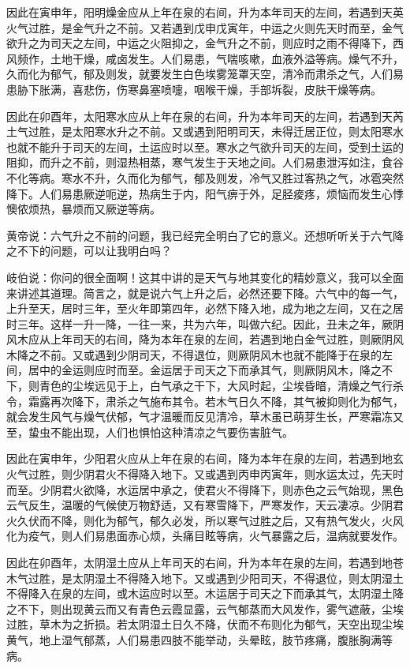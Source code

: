 \documentclass[12pt,UTF8]{ctexbook}
\begin{document}
因此在寅申年，阳明燥金应从上年在泉的右间，升为本年司天的左间，若遇到天英火气过胜，是金气升之不前。又若遇到戊申戊寅年，中运之火则先天时而至，金气欲升之为司天之左间，中运之火阻抑之，金气升之不前，则应时之雨不得降下，西风频作，土地干燥，咸卤发生。人们易患，气喘咳嗽，血液外溢等病。燥气不升，久而化为郁气，郁及则发，就要发生白色埃雾笼罩天空，清冷而肃杀之气，人们易患胁下胀满，喜悲伤，伤寒鼻塞喷嚏，咽喉干燥，手部坼裂，皮肤干燥等病。

因此在卯酉年，太阳寒水应从上年在泉的右间，升为本年司天的左间，若遇到天芮土气过胜，是太阳寒水升之不前。又或遇到阳明司天，未得迁居正位，则太阳寒水也就不能升于司天的左间，土运应时以至。寒水之气欲升司天的左间，受到土运的阻抑，而升之不前，则湿热相蒸，寒气发生于天地之间。人们易患泄泻如注，食谷不化等病。寒水不升，久而化为郁气，郁及则发，冷气又胜过客热之气，冰雹突然降下。人们易患厥逆呃逆，热病生于内，阳气痹于外，足胫痠疼，烦恼而发生心悸懊侬烦热，暴烦而又厥逆等病。

黄帝说：六气升之不前的问题，我已经完全明白了它的意义。还想听听关于六气降之不下的问题，可以让我明白吗？

岐伯说：你问的很全面啊！这其中讲的是天气与地其变化的精妙意义，我可以全面来讲述其道理。简言之，就是说六气上升之后，必然还要下降。六气中的每一气，上升至天，居时三年，至火年即第四年，必然下降入地，成为地之左间，又在之居时三年。这样一升一降，一往一来，共为六年，叫做六纪。因此，丑未之年，厥阴风木应从上年司天的右间，降为本年在泉的左间，若遇到地白金气过胜，则厥阴风木降之不前。又或遇到少阴司天，不得退位，则厥阴风木也就不能降于在泉的左间，居中的金运则应时而至。金运居于司天之下而承其气，则厥阴风木，降之不下，则青色的尘埃远见于上，白气承之干下，大风时起，尘埃昏暗，清燥之气行杀令，霜露再次降下，肃杀之气施布其令。若木气日久不降，其气被抑则化为郁气，就会发生风气与燥气伏郁，气才温暖而反见清冷，草木虽已萌芽生长，严寒霜冻又至，蛰虫不能出现，人们也惧怕这种清凉之气要伤害脏气。

因此在寅申年，少阳君火应从上年在泉的右间，降为本年在泉的左间，若遇到地玄火气过胜，则少阴君火不得降入地下。又或遇到丙申丙寅年，则水运太过，先天时而至。少阴君火欲降，水运居中承之，使君火不得降下，则赤色之云气始现，黑色云气反生，温暖的气候使万物舒适，又有寒雪降下，严寒发作，天云凄凉。少阴君火久伏而不降，则化为郁气，郁久必发，所以寒气过胜之后，又有热气发火，火风化为疫气，则人们易患面赤心烦，头痛目眩等病，火气暴露之后，温病就要发作。

因此在卯酉年，太阴湿土应从上年司天的右间，升为本年在泉的左间，若遇到地苍木气过胜，是太阴湿土不得降入地下。又或遇到少阳司天，不得退位，则太阴湿土不得降入在泉的左间，或木运应时以至。木运居于司天之下而承其气，太阴湿土降之不下，则出现黄云而又有青色云霞显露，云气郁蒸而大风发作，雾气遮蔽，尘埃过胜，草木为之折损。若太阴湿土日久不降，伏而不布则化为郁气，天空出现尘埃黄气，地上湿气郁蒸，人们易患四肢不能举动，头晕眩，肢节疼痛，腹胀胸满等病。
\end{document}
